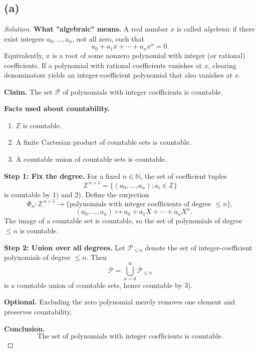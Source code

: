 \documentclass[12pt,a4paper]{article}
\theoremstyle{definition}
\theoremstyle{remark}
\newenvironment{solution}{\begin{proof}[Solution]}{\end{proof}}
\begin{document}
\subsection*{(a)}
\begin{solution}
\textbf{What "algebraic" means.} A real number $x$ is called \emph{algebraic} if there exist integers $a_0,\dots,a_n$, not all zero, such that
\[
 a_0 + a_1 x + \cdots + a_n x^n = 0.
\]
Equivalently, $x$ is a root of some nonzero polynomial with integer (or rational) coefficients. If a polynomial with rational coefficients vanishes at $x$, clearing denominators yields an integer-coefficient polynomial that also vanishes at $x$.

\medskip
\textbf{Claim.} The set $\mathcal P$ of polynomials with integer coefficients is countable.

\textbf{Facts used about countability.}
\begin{enumerate}[label=\arabic*)]
    \item $\mathbb Z$ is countable.
    \item A finite Cartesian product of countable sets is countable.
    \item A countable union of countable sets is countable.
\end{enumerate}

\textbf{Step 1: Fix the degree.} For a fixed $n\in\mathbb N$, the set of coefficient tuples
\[
 \mathbb Z^{\,n+1} = \{(a_0,\dots,a_n): a_i\in\mathbb Z\}
\]
is countable by 1) and 2). Define the surjection
\[
 \Phi_n: \mathbb Z^{\,n+1} \to \{\text{polynomials with integer coefficients of degree }\le n\},
\]
\[ \quad
 (a_0,\dots,a_n)\mapsto a_0 + a_1 X + \cdots + a_n X^n.
\]
The image of a countable set is countable, so the set of polynomials of degree $\le n$ is countable.

\textbf{Step 2: Union over all degrees.} Let $\mathcal P_{\le n}$ denote the set of integer-coefficient polynomials of degree $\le n$. Then
\[
 \mathcal P = \bigcup_{n=0}^{\infty} \mathcal P_{\le n}
\]
is a countable union of countable sets, hence countable by 3).

\textbf{Optional.} Excluding the zero polynomial merely removes one element and preserves countability.

\textbf{Conclusion.}
\[
 \boxed{\text{The set of polynomials with integer coefficients is countable.}}
\]
\end{solution}
\end{document}
